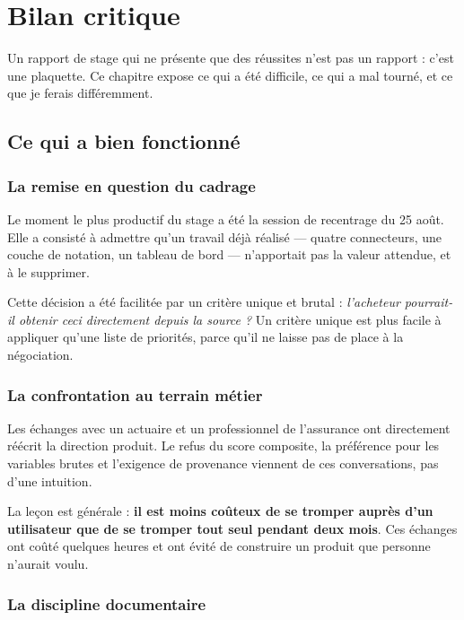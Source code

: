 \chapter{Bilan critique}
\label{ch:bilan}

Un rapport de stage qui ne présente que des réussites n'est pas un rapport :
c'est une plaquette. Ce chapitre expose ce qui a été difficile, ce qui a mal
tourné, et ce que je ferais différemment.

\section{Ce qui a bien fonctionné}

\subsection{La remise en question du cadrage}

Le moment le plus productif du stage a été la session de recentrage du
25 août. Elle a consisté à admettre qu'un travail déjà réalisé — quatre
connecteurs, une couche de notation, un tableau de bord — n'apportait pas la
valeur attendue, et à le supprimer.

Cette décision a été facilitée par un critère unique et brutal :
\emph{l'acheteur pourrait-il obtenir ceci directement depuis la source ?} Un
critère unique est plus facile à appliquer qu'une liste de priorités, parce
qu'il ne laisse pas de place à la négociation.

\subsection{La confrontation au terrain métier}

Les échanges avec un actuaire et un professionnel de l'assurance ont
directement réécrit la direction produit. Le refus du score composite, la
préférence pour les variables brutes et l'exigence de provenance viennent de
ces conversations, pas d'une intuition.

La leçon est générale : \textbf{il est moins coûteux de se tromper auprès d'un
utilisateur que de se tromper tout seul pendant deux mois}. Ces échanges ont
coûté quelques heures et ont évité de construire un produit que personne
n'aurait voulu.

\subsection{La discipline documentaire}

